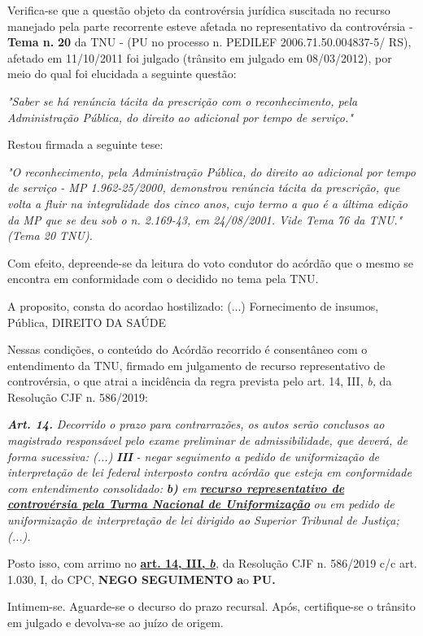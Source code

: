 \documentclass[12pt]{article}
\begin{document}
\justifying
\noindent Verifica-se que a questão objeto da controvérsia jurídica suscitada no recurso manejado pela parte recorrente esteve afetada no representativo da controvérsia - \textbf{Tema n. }\textbf{20} da TNU - (PU no processo n. PEDILEF 2006.71.50.004837-5/ RS),  afetado em 11/10/2011 foi julgado (trânsito em julgado em 08/03/2012), por meio do qual foi elucidada a seguinte questão:

\noindent \textit{"Saber se há renúncia tácita da prescrição com o reconhecimento, pela Administração Pública, do direito ao adicional por tempo de serviço."}

\noindent Restou firmada a seguinte tese:

\noindent \textit{"O reconhecimento, pela Administração Pública, do direito ao adicional por tempo de serviço - MP 1.962-25/2000, demonstrou renúncia tácita da prescrição, que volta a fluir na integralidade dos cinco anos, cujo termo a quo é a última edição da MP que se deu sob o n. 2.169-43, em 24/08/2001. Vide Tema 76 da TNU." (Tema 20 TNU).}

\noindent Com efeito, depreende-se da leitura do voto condutor do acórdão que o mesmo se encontra em conformidade com o decidido no  tema pela TNU.

\noindent A proposito, consta do acordao hostilizado: (...) Fornecimento de insumos, Pública, DIREITO DA SAÚDE

\noindent Nessas condições, o conteúdo do Acórdão recorrido é consentâneo com o entendimento da TNU, firmado em julgamento de recurso representativo de controvérsia, o que atrai a incidência da regra prevista pelo art. 14, III, \textit{b,} da Resolução CJF n. 586/2019:

\noindent \textit{\textbf{Art. 14.}}\textit{ Decorrido o prazo para contrarrazões, os autos serão conclusos ao magistrado responsável pelo exame preliminar de admissibilidade, que deverá, de forma sucessiva: (...) }\textit{\textbf{III }}\textit{- negar seguimento a pedido de uniformização de interpretação de lei federal interposto contra acórdão que esteja em conformidade com entendimento consolidado: }\textit{\textbf{b)}}\textit{ em }\uline{\textit{\textbf{recurso representativo de controvérsia pela Turma Nacional de Uniformização}}}\textit{ ou em pedido de uniformização de interpretação de lei dirigido ao Superior Tribunal de Justiça;(...).}

\noindent Posto isso, com arrimo no \uline{\textbf{art. 14, III, }}\uline{\textit{\textbf{b}}}\textit{,} da Resolução CJF n. 586/2019 c/c art. 1.030, I, do CPC, \textbf{NEGO SEGUIMENTO }\textbf{a}o\textbf{ PU}\textbf{.}

\noindent Intimem-se. Aguarde-se o decurso do prazo recursal. Após, certifique-se o trânsito em julgado e devolva-se ao juízo de origem.
\end{document}
